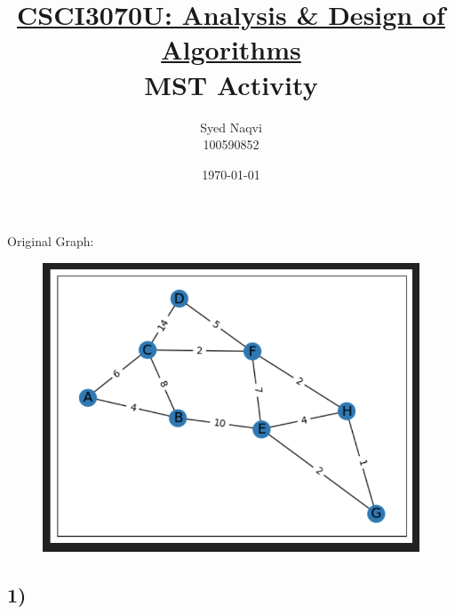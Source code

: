 \documentclass{article}
\title{\textbf{\underline{CSCI3070U: Analysis \& Design of Algorithms}\\MST Activity}}
\author{Syed Naqvi\\100590852}
\date{\today}
\begin{document}
    \maketitle

    \begin{center}
        \begin{minipage}[t]{0.9\textwidth}
            Original Graph:
            \begin{figure}[H]
                \centering
                \includegraphics[width=1\textwidth, height=0.2\textheight]{"./OriginalGraph.png"}
            \end{figure}
        \end{minipage}
    \end{center}
    
    \subsection*{1)}
    
\end{document}
